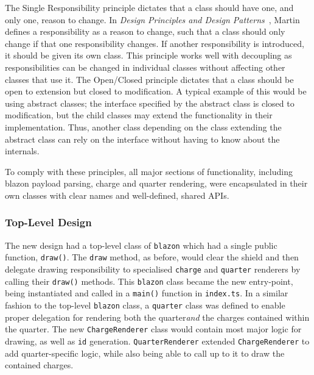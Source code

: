 \documentclass[nobib, a4paper, twoside, justified]{tufte-book}
\makeatletter
\newcommand{\charge}{\gls{charge}\@\xspace}
\newcommand{\charges}{\glspl{charge}\@\xspace}
\newcommand{\quarter}{\gls{quarter}\@\xspace}
\newcommand{\blazon}{\gls{blazon}\@\xspace}
\newcommand{\ublazon}{\Gls{blazon}\@\xspace}
\newcommand{\payload}{\gls{payload}\@\xspace}
\makeatother
\begin{document}
The Single Responsibility principle dictates that a class should have one, and only one, reason to
change. In \textit{Design Principles and Design Patterns}~\autocite{martin2000design}, Martin
defines a responsibility as a reason to change, such that a class should only change if that one
responsibility changes. If another responsibility is introduced, it should be given its own class.
This principle works well with decoupling as responsibilities can be changed in individual classes
without affecting other classes that use it. The Open/Closed principle dictates that a class should
be open to extension but closed to modification. A typical example of this would be using abstract
classes; the interface specified by the abstract class is closed to modification, but the child
classes may extend the functionality in their implementation. Thus, another class depending on the
class extending the abstract class can rely on the interface without having to know about the
internals.

To comply with these principles, all major sections of functionality, including \blazon
\payload parsing, \charge and \quarter rendering, were encapsulated in their own classes with clear
names and well-defined, shared APIs.

\subsubsection{Top-Level Design}%
\label{ssub:top_level_design}

The new design had a top-level class of \texttt{\ublazon} which had a single public function,
\texttt{draw()}. The \texttt{draw} method, as before, would clear the shield and then delegate
drawing responsibility to specialised \texttt{\charge} and \texttt{\quarter} renderers by calling
their \texttt{draw()} methods. This \texttt{\ublazon} class became the new entry-point, being
instantiated and called in a \texttt{main()} function in \texttt{index.ts}. In a similar fashion to
the top-level \texttt{\ublazon} class, a \texttt{\Gls{quarter}} class was defined to enable proper
delegation for rendering both the \quarter \textit{and} the \charges contained within the quarter.
The new \texttt{ChargeRenderer} class would contain most major logic for drawing, as well as
\texttt{id} generation. \texttt{QuarterRenderer} extended \texttt{ChargeRenderer} to add
\quarter-specific logic, while also being able to call up to it to draw the contained \charges.
\end{document}

